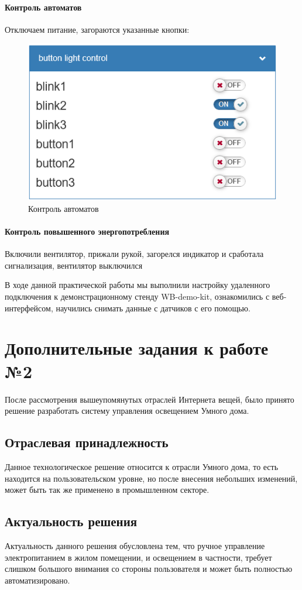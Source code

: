 \documentclass[a4paper,14pt]{extarticle}
\begin{document}
\paragraph{Контроль автоматов}
Отключаем питание, загораются указанные кнопки:

\begin{figure}[hbpt]
	\centering
	\includegraphics[width=0.5\linewidth]{images/auto-gui}
	\caption{Контроль автоматов}
	\label{fig:auto-gui}
\end{figure}
\paragraph{Контроль повышенного энергопотребления}
Включили вентилятор, прижали рукой, загорелся индикатор и сработала сигнализация, вентилятор выключился

В ходе данной практической работы мы выполнили настройку удаленного подключения к демонстрационному стенду  WB-demo-kit, ознакомились с веб-интерфейсом, научились снимать данные с датчиков с его помощью.
\newpage


\section{Дополнительные задания к работе №2}
После рассмотрения вышеупомянутых отраслей Интернета вещей, было принято решение разработать систему управления освещением Умного дома.

\subsection{Отраслевая принадлежность}
Данное технологическое решение относится к отрасли Умного дома, то есть находится на пользовательском уровне, но после внесения небольших изменений, может быть так же применено в промышленном секторе.
\subsection{Актуальность решения}
Актуальность данного решения обусловлена тем, что ручное управление электропитанием в жилом помещении, и освещением в частности, требует слишком большого внимания со стороны пользователя и может быть полностью автоматизировано.
\end{document}
